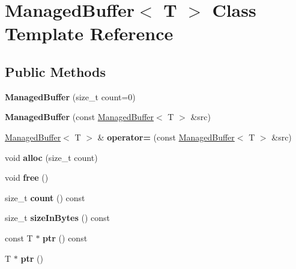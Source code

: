 \hypertarget{class_managed_buffer}{}\section{Managed\+Buffer$<$ T $>$ Class Template Reference}
\label{class_managed_buffer}
\subsection*{Public Methods}
\begin{DoxyCompactItemize}
\item 
\mbox{\label{class_managed_buffer_a3711ebd4cd5540a4fb201bf694a9bd8f}} 
{\bfseries Managed\+Buffer} (size\+\_\+t count=0)
\item 
\mbox{\label{class_managed_buffer_af918356ed83d66ee5f5754138248c0ee}} 
{\bfseries Managed\+Buffer} (const \hyperlink{class_managed_buffer}{Managed\+Buffer}$<$ T $>$ \&src)
\item 
\mbox{\label{class_managed_buffer_a60292e827eed337d15fa83ddd7c43f3c}} 
\hyperlink{class_managed_buffer}{Managed\+Buffer}$<$ T $>$ \& {\bfseries operator=} (const \hyperlink{class_managed_buffer}{Managed\+Buffer}$<$ T $>$ \&src)
\item 
\mbox{\label{class_managed_buffer_a238a341cfb7fb61368438cea173eec66}} 
void {\bfseries alloc} (size\+\_\+t count)
\item 
\mbox{\label{class_managed_buffer_a75b31c20b5b53f506f3ee721832dbd93}} 
void {\bfseries free} ()
\item 
\mbox{\label{class_managed_buffer_a47a87e93e54480fa10c99dcc46713dd2}} 
size\+\_\+t {\bfseries count} () const
\item 
\mbox{\label{class_managed_buffer_a0e52d3f812fc148658f71e8a7a0f23ff}} 
size\+\_\+t {\bfseries size\+In\+Bytes} () const
\item 
\mbox{\label{class_managed_buffer_a4c8940c357fd1b3587d244f7affe836b}} 
const T $\ast$ {\bfseries ptr} () const
\item 
\mbox{\label{class_managed_buffer_a8bfd38279585a566193f98c8890f8c76}} 
T $\ast$ {\bfseries ptr} ()
\end{DoxyCompactItemize}
